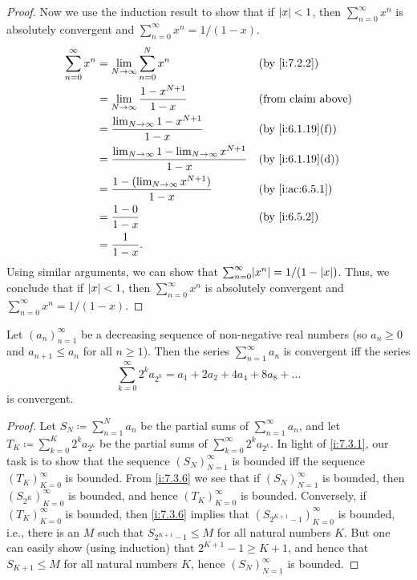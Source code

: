 \begin{proof}
  Now we use the induction result to show that if \(\left\lvert x\right\rvert < 1\), then \(\sum_{n = 0}^\infty x^n\) is absolutely convergent and \(\sum_{n = 0}^\infty x^n = 1 / (1 - x)\).
  \begin{align*}
    \sum_{n = 0}^\infty x^n & = \lim_{N \to \infty} \sum_{n = 0}^N x^n                               &  & \by{i:7.2.2}              \\
                            & = \lim_{N \to \infty} \dfrac{1 - x^{N + 1}}{1 - x}                     &  & \text{(from claim above)} \\
                            & = \dfrac{\lim_{N \to \infty} 1 - x^{N + 1}}{1 - x}                     &  & \by{i:6.1.19}[f]          \\
                            & = \dfrac{\lim_{N \to \infty} 1 - \lim_{N \to \infty} x^{N + 1}}{1 - x} &  & \by{i:6.1.19}[d]          \\
                            & = \dfrac{1 - (\lim_{N \to \infty} x^{N + 1})}{1 - x}                   &  & \by{i:ac:6.5.1}           \\
                            & = \dfrac{1 - 0}{1 - x}                                                 &  & \by{i:6.5.2}              \\
                            & = \dfrac{1}{1 - x}.
  \end{align*}
  Using similar arguments, we can show that \(\sum_{n = 0}^\infty \abs{x^n} = 1 / (1 - \abs{x})\).
  Thus, we conclude that if \(\left\lvert x\right\rvert < 1\), then \(\sum_{n = 0}^\infty x^n\) is absolutely convergent and \(\sum_{n = 0}^\infty x^n = 1 / (1 - x)\).
\end{proof}

\begin{prop}\label{i:7.3.4}
  Let \((a_n)_{n = 1}^\infty\) be a decreasing sequence of non-negative real numbers
  (so \(a_n \geq 0\) and \(a_{n + 1} \leq a_n\) for all \(n \geq 1\)).
  Then the series \(\sum_{n = 1}^\infty a_n\) is convergent iff the series
  \[
    \sum_{k = 0}^\infty 2^k a_{2^k} = a_1 + 2a_2 + 4a_4 + 8a_8 + \dots
  \]
  is convergent.
\end{prop}

\begin{proof}
  Let \(S_N \coloneqq \sum_{n = 1}^N a_n\) be the partial sums of \(\sum_{n = 1}^\infty a_n\), and let \(T_K \coloneqq \sum_{k = 0}^K 2^k a_{2^k}\) be the partial sums of \(\sum_{k = 0}^\infty 2^k a_{2^k}\).
  In light of \cref{i:7.3.1}, our task is to show that the sequence \((S_N)_{N = 1}^\infty\) is bounded iff the sequence \((T_K)_{K = 0}^\infty\) is bounded.
  From \cref{i:7.3.6} we see that if \((S_N)_{N = 1}^\infty\) is bounded, then \((S_{2^K})_{K = 0}^\infty\) is bounded, and hence \((T_K)_{K = 0}^\infty\) is bounded.
  Conversely, if \((T_K)_{K = 0}^\infty\) is bounded, then \cref{i:7.3.6} implies that \((S_{2^{K + 1} - 1})_{K = 0}^\infty\) is bounded, i.e., there is an \(M\) such that \(S_{2^{K + 1} - 1} \leq M\) for all natural numbers \(K\).
  But one can easily show (using induction) that \(2^{K + 1} - 1 \geq K + 1\), and hence that \(S_{K + 1} \leq M\) for all natural numbers \(K\), hence \((S_N)_{N = 1}^\infty\) is bounded.
\end{proof}

